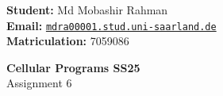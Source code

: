 




\noindent
\begin{minipage}[t]{0.55\textwidth}
    \textsf{\textbf{Student:}} Md Mobashir Rahman \\
    \textbf{Email:} \href{mailto:mdra00001.stud.uni-saarland.de}{\texttt{mdra00001.stud.uni-saarland.de}} \\
    \textsf{\textbf{Matriculation:}} 7059086
\end{minipage}
\hfill
\begin{minipage}[t]{0.4\textwidth}
    \raggedleft
    \begin{Large}
        \textsf{\textbf{Cellular Programs SS25}}\\
        Assignment 6
    \end{Large}
\end{minipage}


